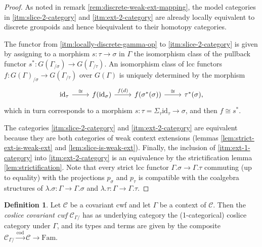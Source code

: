 \documentclass[a4paper]{article}
\theoremstyle{remark}
\theoremstyle{definition}
\newtheorem{definition}[theorem]{Definition}
\begin{document}
\begin{proof}
  As noted in remark \ref{rem:discrete-weak-ext-mapping}, the model categories in \ref{itm:slice-2-category} and \ref{itm:ext-2-category} are already locally equivalent to discrete groupoids and hence biequivalent to their homotopy categories.

  The functor from \ref{itm:locally-discrete-gamma-op} to \ref{itm:slice-2-category} is given by assigning to a morphism $s : \tau \rightarrow \sigma$ in $\Gamma$ the isomorphism class of the pullback functor $s^* : G(\Gamma_{/ \sigma}) \rightarrow G(\Gamma_{/ \tau})$.
  An isomorphism class of lcc functors $f : G(\Gamma)_{/ \sigma} \rightarrow G(\Gamma_{/ \tau})$ over $G(\Gamma)$ is uniquely determined by the morphism
  \begin{equation}
    \begin{tikzcd}
      \mathrm{id}_\tau \arrow[r, "\cong"] & f(\mathrm{id}_\sigma) \arrow[r, "f(d)"] & f(\sigma^*(\sigma)) \arrow[r, "\cong"] & \tau^*(\sigma),
    \end{tikzcd}
  \end{equation}
  which in turn corresponds to a morphism $s : \tau = \Sigma_\tau \mathrm{id}_\tau \rightarrow \sigma$, and then $f \cong s^*$.

  The categories \ref{itm:slice-2-category} and \ref{itm:ext-2-category} are equivalent because they are both categories of weak context extensions (lemmas \ref{lem:strict-ext-is-weak-ext} and \ref{lem:slice-is-weak-ext}).
  Finally, the inclusion of \ref{itm:ext-1-category} into \ref{itm:ext-2-category} is an equivalence by the strictification lemma \ref{lem:strictification}.
  Note that every strict lcc functor $\Gamma.\sigma \rightarrow \Gamma.\tau$ commuting (up to equality) with the projections $p_\sigma$ and $p_\tau$ is compatible with the coalgebra structures of $\lambda.\sigma : \Gamma \rightarrow \Gamma.\sigma$ and $\lambda.\tau : \Gamma \rightarrow \Gamma.\tau$.
\end{proof}

\begin{definition}
  Let $\mathcal{C}$ be a covariant cwf and let $\Gamma$ be a context of $ \mathcal{C}$.
  Then the \emph{coslice covariant cwf} $\mathcal{C}_{\Gamma /}$ has as underlying category the (1-categorical) coslice category under $\Gamma$, and its types and terms are given by the composite $\mathcal{C}_{\Gamma /} \xrightarrow{\mathrm{cod}} \mathcal{C} \rightarrow \mathrm{Fam}$.
\end{definition}
\end{document}
